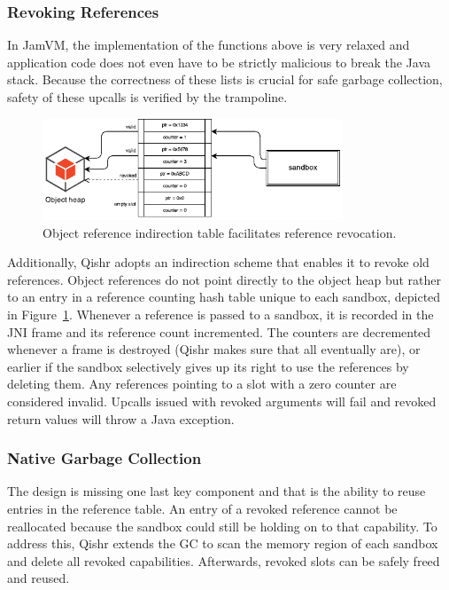 \documentclass[a4paper,12pt,twoside,openright]{report}
\begin{document}
\subsubsection{Revoking References}

In JamVM, the implementation of the functions above is very relaxed and application code does not even have to be strictly malicious to break the Java stack. Because the correctness of these lists is crucial for safe garbage collection, safety of these upcalls is verified by the trampoline.

\begin{figure}
	\centering
	\includegraphics[width=0.8\textwidth]{dia_indirection_table.pdf}
	\caption{Object reference indirection table facilitates reference revocation.}
	\label{fig:IndirectionTable}
\end{figure}

Additionally, Qishr adopts an indirection scheme that enables it to revoke old references. Object references do not point directly to the object heap but rather to an entry in a reference counting hash table unique to each sandbox, depicted in Figure~\ref{fig:IndirectionTable}. Whenever a reference is passed to a sandbox, it is recorded in the JNI frame and its reference count incremented. The counters are decremented whenever a frame is destroyed (Qishr makes sure that all eventually are), or earlier if the sandbox selectively gives up its right to use the references by deleting them. Any references pointing to a slot with a zero counter are considered invalid. Upcalls issued with revoked arguments will fail and revoked return values will throw a Java exception.

\subsubsection{Native Garbage Collection}

The design is missing one last key component and that is the ability to reuse entries in the reference table. An entry of a revoked reference cannot be reallocated because the sandbox could still be holding on to that capability. To address this, Qishr extends the GC to scan the memory region of each sandbox and delete all revoked capabilities. Afterwards, revoked slots can be safely freed and reused.
\end{document}

